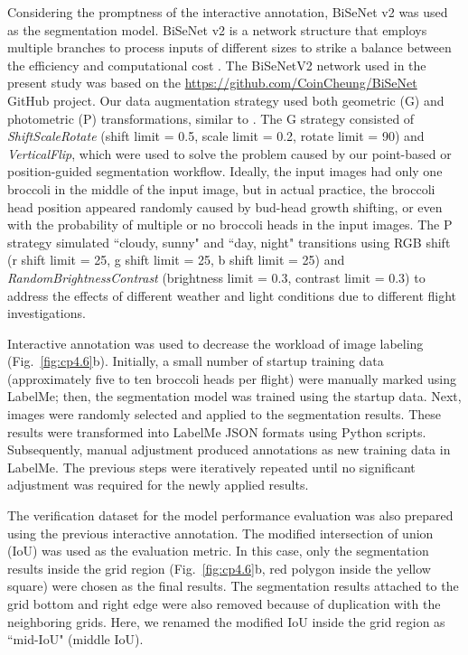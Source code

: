 Considering the promptness of the interactive annotation, BiSeNet v2 \citep{yu_bisenet_2020} was used as the segmentation model. BiSeNet v2 is a network structure that employs multiple branches to process inputs of different sizes to strike a balance between the efficiency and computational cost \citep[Fig.~1]{yu_bisenet_2020}. The BiSeNetV2 network used in the present study was based on the \url{https://github.com/CoinCheung/BiSeNet} GitHub project. Our data augmentation strategy used both geometric (G) and photometric (P) transformations, similar to \citet{blok_effect_2021}. The G strategy consisted of \textit{ShiftScaleRotate} (shift limit = 0.5, scale limit = 0.2, rotate limit = 90) and \textit{VerticalFlip}, which were used to solve the problem caused by our point-based or position-guided segmentation workflow. Ideally, the input images had only one broccoli in the middle of the input image, but in actual practice, the broccoli head position appeared randomly caused by bud-head growth shifting, or even with the probability of multiple or no broccoli heads in the input images. The P strategy simulated ``cloudy, sunny" and ``day, night" transitions using RGB shift (r shift limit = 25, g shift limit = 25, b shift limit = 25) and \textit{RandomBrightnessContrast} (brightness limit = 0.3, contrast limit = 0.3) to address the effects of different weather and light conditions due to different flight investigations.

Interactive annotation was used to decrease the workload of image labeling \linebreak (Fig.~\ref{fig:cp4.6}b). Initially, a small number of startup training data (approximately five to ten broccoli heads per flight) were manually marked using LabelMe; then, the segmentation model was trained using the startup data. Next, images were randomly selected and applied to the segmentation results. These results were transformed into LabelMe JSON formats using Python scripts. Subsequently, manual adjustment produced annotations as new training data in LabelMe. The previous steps were iteratively repeated until no significant adjustment was required for the newly applied results.

The verification dataset for the model performance evaluation was also prepared using the previous interactive annotation. The modified intersection of union (IoU) was used as the evaluation metric. In this case, only the segmentation results inside the grid region (Fig.~\ref{fig:cp4.6}b, red polygon inside the yellow square) were chosen as the final results. The segmentation results attached to the grid bottom and right edge were also removed because of duplication with the neighboring grids. Here, we renamed the modified IoU inside the grid region as ``mid-IoU" (middle IoU).

